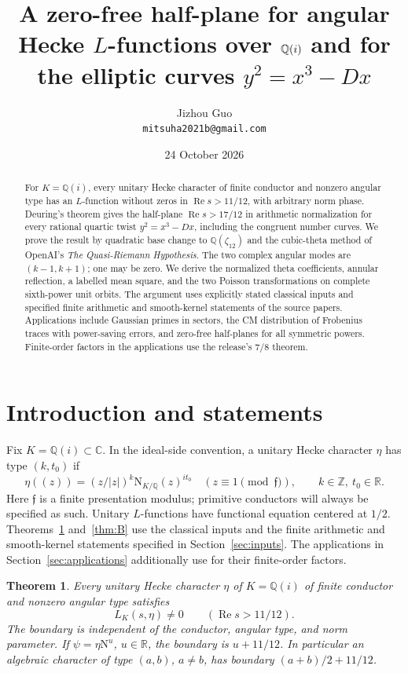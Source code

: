\documentclass[11pt,a4paper]{article}
\title{A zero-free half-plane for angular Hecke $L$-functions over $\Q(i)$ and for the elliptic curves $y^2=x^3-Dx$}
\author{Jizhou Guo\\\texttt{mitsuha2021b@gmail.com}}
\date{24 October 2026}
\numberwithin{equation}{section}
\newtheorem{maintheorem}{Theorem}
\theoremstyle{definition}
\theoremstyle{remark}
\newcommand{\Q}{\mathbb Q}
\newcommand{\C}{\mathbb C}
\newcommand{\R}{\mathbb R}
\newcommand{\Z}{\mathbb Z}
\newcommand{\N}{\mathrm N}
\newcommand{\Rea}{\operatorname{Re}}
\begin{document}
\maketitle
\begin{abstract}
For $K=\Q(i)$, every unitary Hecke character of finite conductor and nonzero angular type has an $L$-function without zeros in $\Rea s>11/12$, with arbitrary norm phase. Deuring's theorem gives the half-plane $\Rea s>17/12$ in arithmetic normalization for every rational quartic twist $y^2=x^3-Dx$, including the congruent number curves. We prove the result by quadratic base change to $\Q(\zeta_{12})$ and the cubic-theta method of OpenAI's \emph{The Quasi-Riemann Hypothesis}. The two complex angular modes are $(k-1,k+1)$; one may be zero. We derive the normalized theta coefficients, annular reflection, a labelled mean square, and the two Poisson transformations on complete sixth-power unit orbits. The argument uses explicitly stated classical inputs and specified finite arithmetic and smooth-kernel statements of the source papers. Applications include Gaussian primes in sectors, the CM distribution of Frobenius traces with power-saving errors, and zero-free half-planes for all symmetric powers. Finite-order factors in the applications use the release's $7/8$ theorem.
\end{abstract}
\tableofcontents

\section{Introduction and statements}\label{sec:intro}
Fix $K=\Q(i)\subset\C$. In the ideal-side convention, a unitary Hecke character $\eta$ has type $(k,t_0)$ if
\begin{equation}\label{eq:type}
 \eta((z))=(z/|z|)^k\N_{K/\Q}(z)^{it_0}
 \quad(z\equiv1\pmod{\mathfrak f}),\qquad k\in\Z,\ t_0\in\R.
\end{equation}
Here $\mathfrak f$ is a finite presentation modulus; primitive conductors will always be specified as such. Unitary $L$-functions have functional equation centered at $1/2$. Theorems~\ref{thm:A} and~\ref{thm:B} use the classical inputs and the finite arithmetic and smooth-kernel statements specified in Section~\ref{sec:inputs}. The applications in Section~\ref{sec:applications} additionally use \cite[Theorem 1.1]{QRH78} for their finite-order factors.

\begin{maintheorem}\label{thm:A}
Every unitary Hecke character $\eta$ of $K=\Q(i)$ of finite conductor and nonzero angular type satisfies
\[
 L_K(s,\eta)\ne0\qquad(\Rea s>11/12).
\]
The boundary is independent of the conductor, angular type, and norm parameter. If $\psi=\eta\N^u$, $u\in\R$, the boundary is $u+11/12$. In particular an algebraic character of type $(a,b)$, $a\ne b$, has boundary $(a+b)/2+11/12$.
\end{maintheorem}
\end{document}

